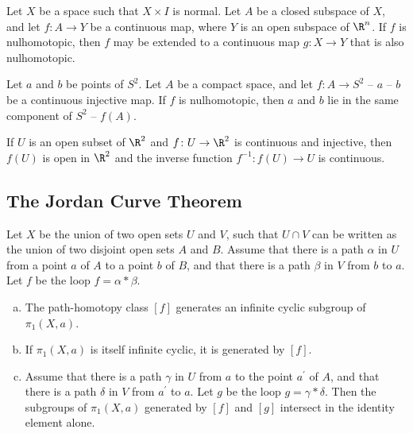 \begin{lemma}
Let $X$ be a space such that $X \times I$ is normal. Let $A$ be a closed subspace of $X$, and let $f\colon A \rightarrow Y$ be a continuous map,
where $Y$ is an open subspace of $\R^n$. If $f$ is nulhomotopic, then $f$ may be extended to a continuous map
$g \colon X\rightarrow Y$ that is also nulhomotopic.
\end{lemma}

\begin{lemma}
Let $a$ and $b$ be points of $S^2$. Let $A$ be a compact space, and let $f\colon A \rightarrow S^2 \text{ -- } a \text{ -- } b$ be a continuous injective map.
If $f$ is nulhomotopic, then $a$ and $b$ lie in the same component of $S^2 \text{ -- } f(A)$. 
\end{lemma}

\begin{theorem}
If $U$ is an open subset of $\R^2$ and $f\colon U \rightarrow \R^2$ is continuous and injective, then $f(U)$ is open in $\R^2$ and the inverse function
$f^{-1} \colon f(U) \rightarrow U$ is continuous.
\end{theorem}

\subsection{The Jordan Curve Theorem}

\begin{theorem}
Let $X$ be the union of two open sets $U$ and $V$, such that $U \cap V$ can be written as the union of two disjoint open sets $A$ and $B$. 
Assume that there is a path $\alpha$ in $U$ from a point $a$ of $A$ to a point $b$ of $B$, and that there is a path $\beta$ in $V$
from $b$ to $a$. Let $f$ be the loop $f = \alpha * \beta$.
\begin{enumerate}[a)]
    \item The path-homotopy class $[f]$ generates an infinite cyclic subgroup of $\pi_1(X, a)$.
    \item If $\pi_1(X, a)$ is itself infinite cyclic, it is generated by $[f]$.
    \item Assume that there is a path $\gamma$ in $U$ from $a$ to the point $a^{\prime}$ of $A$, and that there is a path $\delta$ in $V$ from $a^{\prime}$ to $a$. 
    Let $g$ be the loop $g = \gamma * \delta$. Then the subgroups of $\pi_1(X, a)$ generated by $[f]$ and $[g]$ intersect in the identity element alone.
\end{enumerate}
\end{theorem}

